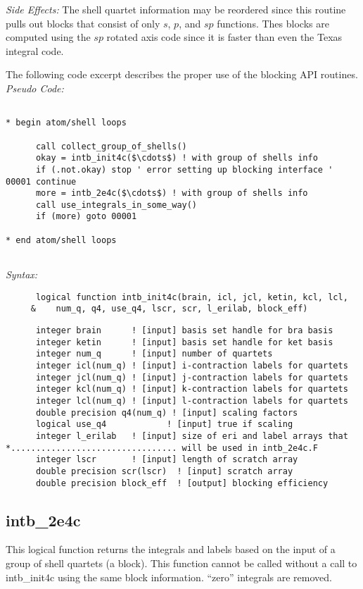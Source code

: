 {\it Side Effects:}  The shell quartet information may be reordered 
since this routine pulls out blocks that consist of only $s$, $p$,  
and $sp$ functions.  Thes blocks are computed using the $sp$ rotated 
axis code since it is faster than even the Texas integral code. 
 
The following code excerpt describes the proper use of the blocking 
API routines.\\ 
{\it Pseudo Code:} 
\begin{verbatim} 
 
* begin atom/shell loops 
 
      call collect_group_of_shells() 
      okay = intb_init4c($\cdots$) ! with group of shells info      
      if (.not.okay) stop ' error setting up blocking interface ' 
00001 continue 
      more = intb_2e4c($\cdots$) ! with group of shells info 
      call use_integrals_in_some_way() 
      if (more) goto 00001 
 
* end atom/shell loops 
 
\end{verbatim} 
 
{\it Syntax:} 
\begin{verbatim} 
      logical function intb_init4c(brain, icl, jcl, ketin, kcl, lcl, 
     &    num_q, q4, use_q4, lscr, scr, l_erilab, block_eff) 
\end{verbatim} 
\begin{verbatim} 
      integer brain      ! [input] basis set handle for bra basis 
      integer ketin      ! [input] basis set handle for ket basis 
      integer num_q      ! [input] number of quartets 
      integer icl(num_q) ! [input] i-contraction labels for quartets 
      integer jcl(num_q) ! [input] j-contraction labels for quartets 
      integer kcl(num_q) ! [input] k-contraction labels for quartets 
      integer lcl(num_q) ! [input] l-contraction labels for quartets 
      double precision q4(num_q) ! [input] scaling factors 
      logical use_q4            ! [input] true if scaling 
      integer l_erilab   ! [input] size of eri and label arrays that  
*................................. will be used in intb_2e4c.F 
      integer lscr       ! [input] length of scratch array 
      double precision scr(lscr)  ! [input] scratch array 
      double precision block_eff  ! [output] blocking efficiency  
\end{verbatim} 
 
\subsection{intb\_2e4c} 
This logical function returns the integrals and labels based on the 
input of a group of shell quartets (a block).  This function cannot be 
called without a call to intb\_init4c using the same block information. 
``zero'' integrals are removed. 
 
